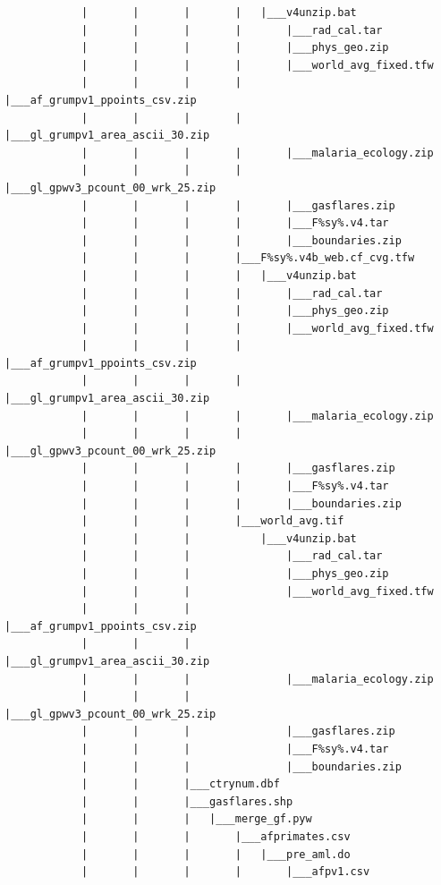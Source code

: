 \documentclass[
]{book}
\begin{document}
\begin{verbatim}
            |       |       |       |   |___v4unzip.bat
            |       |       |       |       |___rad_cal.tar
            |       |       |       |       |___phys_geo.zip
            |       |       |       |       |___world_avg_fixed.tfw
            |       |       |       |       |___af_grumpv1_ppoints_csv.zip
            |       |       |       |       |___gl_grumpv1_area_ascii_30.zip
            |       |       |       |       |___malaria_ecology.zip
            |       |       |       |       |___gl_gpwv3_pcount_00_wrk_25.zip
            |       |       |       |       |___gasflares.zip
            |       |       |       |       |___F%sy%.v4.tar
            |       |       |       |       |___boundaries.zip
            |       |       |       |___F%sy%.v4b_web.cf_cvg.tfw
            |       |       |       |   |___v4unzip.bat
            |       |       |       |       |___rad_cal.tar
            |       |       |       |       |___phys_geo.zip
            |       |       |       |       |___world_avg_fixed.tfw
            |       |       |       |       |___af_grumpv1_ppoints_csv.zip
            |       |       |       |       |___gl_grumpv1_area_ascii_30.zip
            |       |       |       |       |___malaria_ecology.zip
            |       |       |       |       |___gl_gpwv3_pcount_00_wrk_25.zip
            |       |       |       |       |___gasflares.zip
            |       |       |       |       |___F%sy%.v4.tar
            |       |       |       |       |___boundaries.zip
            |       |       |       |___world_avg.tif
            |       |       |           |___v4unzip.bat
            |       |       |               |___rad_cal.tar
            |       |       |               |___phys_geo.zip
            |       |       |               |___world_avg_fixed.tfw
            |       |       |               |___af_grumpv1_ppoints_csv.zip
            |       |       |               |___gl_grumpv1_area_ascii_30.zip
            |       |       |               |___malaria_ecology.zip
            |       |       |               |___gl_gpwv3_pcount_00_wrk_25.zip
            |       |       |               |___gasflares.zip
            |       |       |               |___F%sy%.v4.tar
            |       |       |               |___boundaries.zip
            |       |       |___ctrynum.dbf
            |       |       |___gasflares.shp
            |       |       |   |___merge_gf.pyw
            |       |       |       |___afprimates.csv
            |       |       |       |   |___pre_aml.do
            |       |       |       |       |___afpv1.csv

\end{verbatim}
\end{document}
